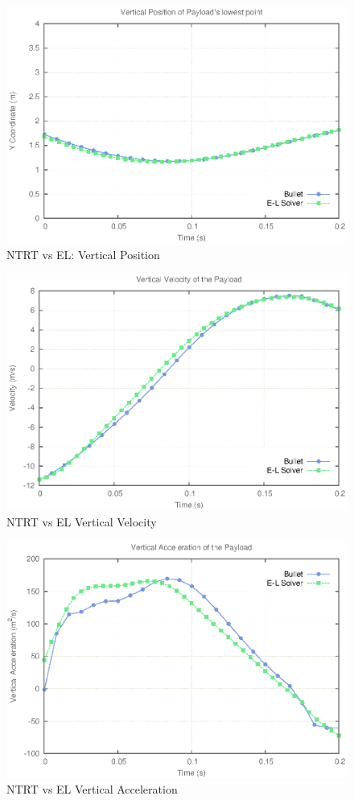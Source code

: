 \begin{figure}[htb]
   \centering
   \includegraphics[width=0.8\columnwidth]{tex/images/landing/bulletVsEL/SimVsEL}
   \caption{NTRT vs EL: Vertical Position}
   \label{fig:vsPosition}
\end{figure}

\begin{figure}[htb]
   \centering
   \includegraphics[width=0.8\columnwidth]{tex/images/landing/bulletVsEL/Velocities}
   \caption{NTRT vs EL Vertical Velocity}
   \label{fig:vsVelocity}
\end{figure}
\begin{figure}[htb]
   \centering
   \includegraphics[width=0.8\columnwidth]{tex/images/landing/bulletVsEL/VelocityDerivatives_SimVsEL}
   \caption{NTRT vs EL Vertical Acceleration}
   \label{fig:vsAccelerations}
\end{figure}


